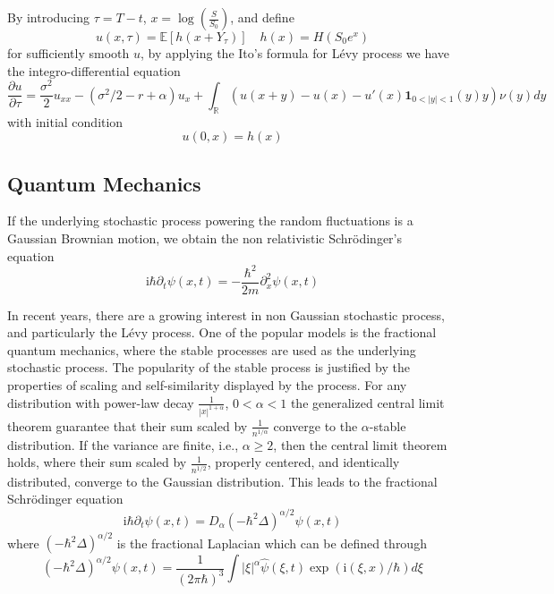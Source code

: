 \documentclass[3p,,preprint,12pt]{elsarticle}
\newcommand{\ii}[0]{\mathrm{i}}
\newcommand{\RR}[0]{\mathbb{R}}
\theoremstyle{definition}
\begin{document}
By introducing $\tau = T-t$, $x=\log\left( \frac{S}{S_0} \right)$, and define
\begin{equation}
	u(x,\tau) = \mathbb{E}[h(x+Y_\tau)]\quad h(x) = H(S_0 e^x)
\end{equation}
 for sufficiently smooth $u$, by applying the Ito's formula for L\'evy process we have the integro-differential equation
\begin{equation}
	\frac{\partial u}{\partial \tau} = \frac{\sigma^2}{2}u_{xx} - (\sigma^2/2-r+\alpha) u_x + \int_\RR (u(x+y)-u(x)-u'(x)\mathbf{1}_{0<|y|<1}(y)y)\nu(y)dy
\end{equation}
with initial condition
\begin{equation}
	u(0,x) = h(x)
\end{equation}


\subsection{Quantum Mechanics}

If the underlying stochastic process powering the random fluctuations is a Gaussian Brownian motion, we obtain the non relativistic Schr\"odinger's equation~\cite{laskin2010principles,hasan2018tunneling,garbaczewski1995schrodinger,laskin2000fractional}
\begin{equation}
	\ii \hbar \partial_t \psi(x,t) = -\frac{\hbar^2}{2m}\partial^2_{x} \psi(x,t)
\end{equation}

In recent years, there are a growing interest in non Gaussian stochastic process, and particularly the L\'evy process. One of the popular models is the fractional quantum mechanics, where the stable processes are used as the underlying stochastic process. The popularity of the stable process is justified by the properties of scaling and self-similarity displayed by the process. For any distribution with power-law decay $\frac{1}{|x|^{1+\alpha}}$, $0<\alpha<1$ the generalized central limit theorem guarantee that their sum scaled by $\frac{1}{n^{1/\alpha}}$ converge to the $\alpha$-stable distribution. If the variance are finite, i.e., $\alpha\geq 2$, then the central limit theorem holds, where  their sum scaled by $\frac{1}{n^{1/2}}$, properly centered, and identically distributed, converge to the Gaussian distribution.  This leads to the fractional Schr\"odinger equation
\begin{equation}
	\ii \hbar \partial_t \psi(x,t) = D_\alpha (-\hbar^2 \Delta)^{\alpha/2}\psi(x,t)
\end{equation}
where $(-\hbar^2 \Delta)^{\alpha/2}$ is the fractional Laplacian which can be defined through
\begin{equation}
	(-\hbar^2 \Delta)^{\alpha/2}\psi(x,t) = \frac{1}{(2\pi \hbar)^3}\int |\xi|^\alpha \hat \psi(\xi,t) \exp(\ii (\xi,x)/\hbar)d\xi
\end{equation}
\end{document}
